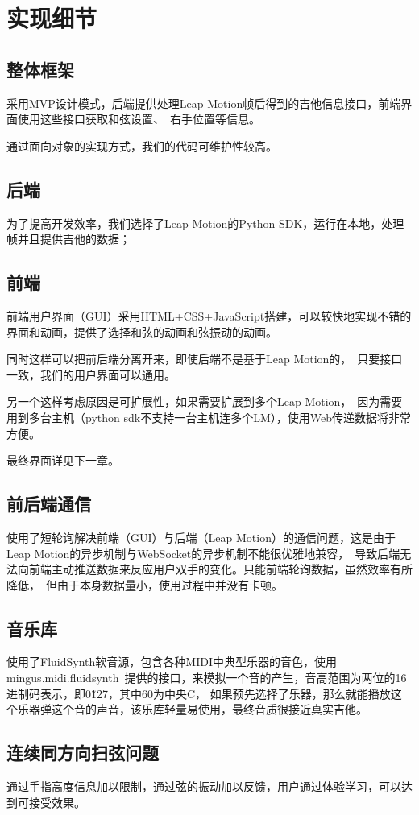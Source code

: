\chapter{实现细节}

    \section{整体框架}

        采用MVP设计模式，后端提供处理Leap Motion帧后得到的吉他信息接口，前端界面使用这些接口获取和弦设置、\
        右手位置等信息。

        通过面向对象的实现方式，我们的代码可维护性较高。

    \section{后端}
        为了提高开发效率，我们选择了Leap Motion的Python SDK，运行在本地，处理帧并且提供吉他的数据；\

    \section{前端}
        前端用户界面（GUI）采用HTML+CSS+JavaScript搭建，可以较快地实现不错的界面和动画，提供了选择和弦的动画和弦振动的动画。\

        同时这样可以把前后端分离开来，即使后端不是基于Leap Motion的，\
        只要接口一致，我们的用户界面可以通用。

        另一个这样考虑原因是可扩展性，如果需要扩展到多个Leap Motion，\
        因为需要用到多台主机（python sdk不支持一台主机连多个LM），使用Web传递数据将非常方便。

        最终界面详见下一章。

    \section{前后端通信}
    使用了短轮询解决前端（GUI）与后端（Leap Motion）的通信问题，这是由于Leap Motion的异步机制与WebSocket的异步机制不能很优雅地兼容，\
    导致后端无法向前端主动推送数据来反应用户双手的变化。只能前端轮询数据，虽然效率有所降低，\
    但由于本身数据量小，使用过程中并没有卡顿。

    \section{音乐库}
    使用了FluidSynth软音源，包含各种MIDI中典型乐器的音色，使用mingus.midi.fluidsynth\
    提供的接口，来模拟一个音的产生，音高范围为两位的16进制码表示，即0\~127，其中60为中央C，
    如果预先选择了乐器，那么就能播放这个乐器弹这个音的声音，该乐库轻量易使用，最终音质很接近真实吉他。

    \section{连续同方向扫弦问题}
    通过手指高度信息加以限制，通过弦的振动加以反馈，用户通过体验学习，可以达到可接受效果。
 

